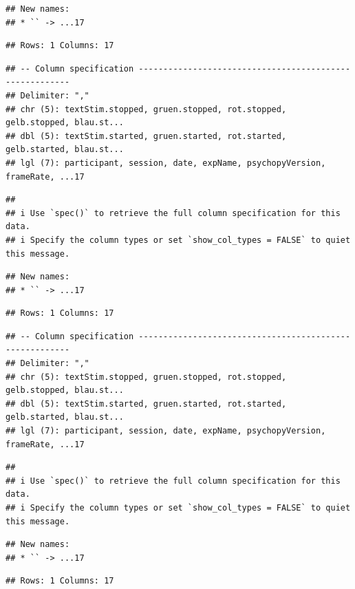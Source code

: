 \documentclass[
]{book}
\begin{document}
\begin{verbatim}
## New names:
## * `` -> ...17
\end{verbatim}

\begin{verbatim}
## Rows: 1 Columns: 17
\end{verbatim}

\begin{verbatim}
## -- Column specification --------------------------------------------------------
## Delimiter: ","
## chr (5): textStim.stopped, gruen.stopped, rot.stopped, gelb.stopped, blau.st...
## dbl (5): textStim.started, gruen.started, rot.started, gelb.started, blau.st...
## lgl (7): participant, session, date, expName, psychopyVersion, frameRate, ...17
\end{verbatim}

\begin{verbatim}
## 
## i Use `spec()` to retrieve the full column specification for this data.
## i Specify the column types or set `show_col_types = FALSE` to quiet this message.
\end{verbatim}

\begin{verbatim}
## New names:
## * `` -> ...17
\end{verbatim}

\begin{verbatim}
## Rows: 1 Columns: 17
\end{verbatim}

\begin{verbatim}
## -- Column specification --------------------------------------------------------
## Delimiter: ","
## chr (5): textStim.stopped, gruen.stopped, rot.stopped, gelb.stopped, blau.st...
## dbl (5): textStim.started, gruen.started, rot.started, gelb.started, blau.st...
## lgl (7): participant, session, date, expName, psychopyVersion, frameRate, ...17
\end{verbatim}

\begin{verbatim}
## 
## i Use `spec()` to retrieve the full column specification for this data.
## i Specify the column types or set `show_col_types = FALSE` to quiet this message.
\end{verbatim}

\begin{verbatim}
## New names:
## * `` -> ...17
\end{verbatim}

\begin{verbatim}
## Rows: 1 Columns: 17
\end{verbatim}
\end{document}
